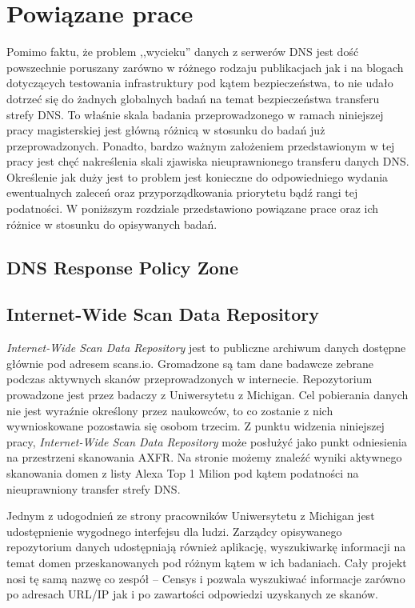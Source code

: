 \chapter{Powiązane prace}
Pomimo faktu, że problem ,,wycieku'' danych z serwerów DNS jest dość powszechnie poruszany zarówno w różnego rodzaju publikacjach\cite{} jak i na blogach dotyczących testowania infrastruktury pod kątem bezpieczeństwa\cite{}, to nie udało dotrzeć się do żadnych globalnych badań na temat bezpieczeństwa transferu strefy DNS. To właśnie skala badania przeprowadzonego w ramach niniejszej pracy magisterskiej jest główną różnicą w stosunku do badań już przeprowadzonych. Ponadto, bardzo ważnym założeniem przedstawionym w tej pracy jest chęć nakreślenia skali zjawiska nieuprawnionego transferu danych DNS. Określenie jak duży jest to problem jest konieczne do odpowiedniego wydania ewentualnych zaleceń oraz przyporządkowania priorytetu bądź rangi tej podatności. W poniższym rozdziale przedstawiono powiązane prace oraz ich różnice w stosunku do opisywanych badań.

\section{DNS Response Policy Zone}


\section{Internet-Wide Scan Data Repository}
\textit{Internet-Wide Scan Data Repository} jest to publiczne archiwum danych dostępne głównie pod adresem scans.io\cite{scansio}. Gromadzone są tam dane badawcze zebrane podczas aktywnych skanów przeprowadzonych w internecie. Repozytorium prowadzone jest przez badaczy z Uniwersytetu z Michigan\cite{teamcensys}. Cel pobierania danych nie jest wyraźnie określony przez naukowców, to co zostanie z nich wywnioskowane pozostawia się osobom trzecim. Z punktu widzenia niniejszej pracy, \textit{Internet-Wide Scan Data Repository} może posłużyć jako punkt odniesienia na przestrzeni skanowania AXFR. Na stronie możemy znaleźć wyniki aktywnego skanowania domen z listy Alexa Top 1 Milion\cite{alexa} pod kątem podatności na nieuprawniony transfer strefy DNS.

Jednym z udogodnień ze strony pracowników Uniwersytetu z Michigan jest udostępnienie wygodnego interfejsu dla ludzi. Zarządcy opisywanego repozytorium danych udostępniają również aplikację, wyszukiwarkę informacji na temat domen przeskanowanych pod różnym kątem w ich badaniach. Cały projekt nosi tę samą nazwę co zespół -- Censys\cite{censys} i pozwala wyszukiwać informacje zarówno po adresach URL/IP jak i po zawartości odpowiedzi uzyskanych ze skanów.

